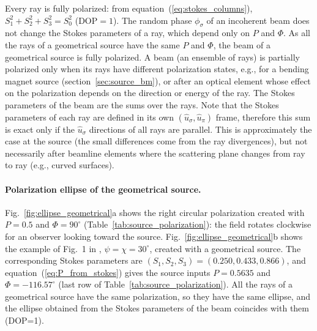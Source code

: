 \documentclass{iucr}
\begin{document}
Every ray is fully polarized: from equation~(\ref{eq:stokes_columns}), $S_1^2+S_2^2+S_3^2=S_0^2$ (DOP$=1$). The random phase $\phi_\sigma$ of an incoherent beam does not change the Stokes parameters of a ray, which depend only on $P$ and $\Phi$. As all the rays of a geometrical source have the same $P$ and $\Phi$, the beam of a geometrical source is fully polarized. A beam (an ensemble of rays) is partially polarized only when its rays have different polarization states, e.g., for a bending magnet source (section~\ref{sec:source_bm}), or after an optical element whose effect on the polarization depends on the direction or energy of the ray. The Stokes parameters of the beam are the sums over the rays. Note that the Stokes parameters of each ray are defined in its own $(\hat{u}_\sigma,\hat{u}_\pi)$ frame, therefore this sum is exact only if the $\hat{u}_\sigma$ directions of all rays are parallel. This is approximately the case at the source (the small differences come from the ray divergences), but not necessarily after beamline elements where the scattering plane changes from ray to ray (e.g., curved surfaces).

\paragraph{Polarization ellipse of the geometrical source.}
Fig.~\ref{fig:ellipse_geometrical}a shows the right circular polarization created with $P=0.5$ and $\Phi=90^\circ$ (Table~\ref{tab:source_polarization}): the field rotates clockwise for an observer looking toward the source. Fig.~\ref{fig:ellipse_geometrical}b shows the example of Fig.~1 in \cite{Detlefs2012}, $\psi=\chi=30^\circ$, created with a geometrical source. The corresponding Stokes parameters are $(S_1,S_2,S_3)=(0.250, 0.433, 0.866)$, and equation~(\ref{eq:P_from_stokes}) gives the source inputs $P=0.5635$ and $\Phi=-116.57^\circ$ (last row of Table~\ref{tab:source_polarization}). All the rays of a geometrical source have the same polarization, so they have the same ellipse, and the ellipse obtained from the Stokes parameters of the beam coincides with them (DOP=1).
\end{document}
